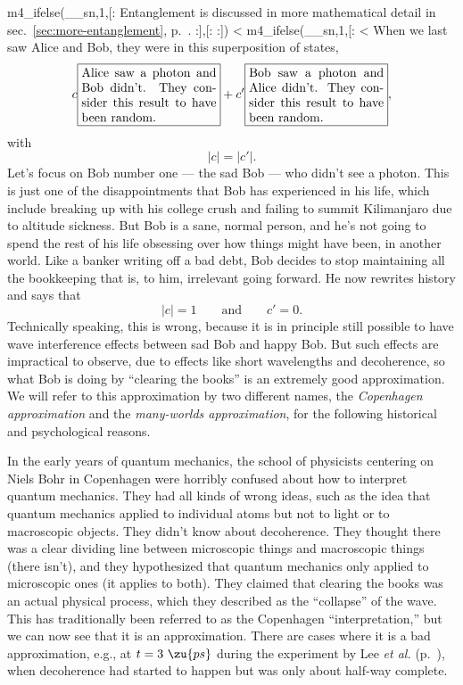 m4_ifelse(__sn,1,[:
Entanglement is discussed in more mathematical detail in sec.~\ref{sec:more-entanglement}, p.~\pageref{sec:more-entanglement}.
:],[:
%
:])
<%
m4_ifelse(__sn,1,[:
<%
When we last saw Alice and Bob, they were in this superposition of states,
\begin{equation*}
 c\fbox{\parbox{38mm}{Alice saw a photon and Bob didn't. They consider this result to have been random.}}
+c'\fbox{\parbox{38mm}{Bob saw a photon and Alice didn't. They consider this result to have been random.}},
\end{equation*}
with
\begin{equation*}
  |c|=|c'|.
\end{equation*}
Let's focus on Bob number one --- the sad Bob --- who didn't see a photon. This is just one of the disappointments
that Bob has experienced in his life, which include breaking up with his college crush and failing
to summit Kilimanjaro due to altitude sickness. But Bob is a sane, normal person, and he's not going
to spend the rest of his life obsessing over how things might have been, in another world. 
Like a banker writing off a bad debt, Bob decides to stop maintaining all the bookkeeping that is,
to him, irrelevant going forward. He now rewrites history and says that
\begin{equation*}
  |c|=1 \qquad \text{and} \qquad c'=0.
\end{equation*}
Technically speaking, this is wrong, because it is in principle still possible to have wave interference
effects between sad Bob and happy Bob. But such effects are impractical to observe,
due to effects like short wavelengths and decoherence, so what Bob is doing
by ``clearing the books''
is an extremely good approximation. We will refer to this approximation by two different names,
the \emph{Copenhagen approximation} and the \emph{many-worlds approximation}, for the following historical and
psychological reasons.

In the early years of quantum mechanics, the school of
physicists\label{copenhagen-introduced} 
centering on Niels Bohr in Copenhagen were horribly confused about how
to interpret quantum mechanics. They had all kinds of wrong ideas,
such as the idea that quantum mechanics applied to individual atoms
but not to light or to macroscopic objects. They didn't know about
decoherence. They thought there was a clear dividing line between
microscopic things and macroscopic things (there isn't), and they
hypothesized that quantum mechanics only applied to microscopic ones
(it applies to both). They claimed that clearing the books was an
actual physical process, which they described as the ``collapse'' of
the wave. This has traditionally been referred to as the Copenhagen ``interpretation,'' but
we can now see that it is an approximation. There are cases where it
is a bad approximation, e.g., at $t=3\ \zu{ps}$ during the experiment
by Lee \emph{et al.} (p.~\pageref{macroscopic-entanglement}), when
decoherence had started to happen but was only about half-way
complete.

